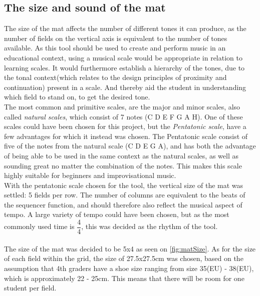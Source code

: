\subsection{The size and sound of the mat } \label{sizeSoundColorMat}
The size of the mat affects the number of different tones it can produce, as the number of fields on the vertical axis is equivalent to the number of tones available. As this tool should be used to create and perform music in an educational context, using a musical scale would be appropriate in relation to learning scales. It would furthermore establish a hierarchy of the tones, due to the tonal context(which relates to the design principles of proximity and continuation\cite{gestalt}) present in a scale\cite{cognitiveFoundationOfPitch}. And thereby aid the student in understanding which field to stand on, to get the desired tone. \\
The most common and primitive scales, are the major and minor scales, also called \textit{natural scales}, which consist of 7 notes (C D E F G A H)\cite{scales}. One of these scales could have been chosen for this project, but the \textit{Pentatonic scale}, have a few advantages for which it instead was chosen. The Pentatonic scale consist of five of the notes from the natural scale (C D E G A), and has both the advantage of being able to be used in the same context as the natural scales, as well as sounding great no matter the combination of the notes\cite{pentatonicScale}. This makes this scale highly suitable for beginners and improvisational music\cite{pentatonicScale}.\\ 

With the pentatonic scale chosen for the tool, the vertical size of the mat was settled: 5 fields per row. The number of columns are equivalent to the beats of the sequencer function, and should therefore also reflect the musical aspect of tempo. A large variety of tempo could have been chosen, but as the most commonly used time is $\dfrac{4}{4} $\cite{tempo}, this was decided as the rhythm of the tool.\\\\
The size of the mat was decided to be 5x4 as seen on \autoref{fig:matSize}. As for the size of each field within the grid, the size of 27.5x27.5cm was chosen, based on the assumption that 4th graders have a shoe size ranging from size 35(EU) - 38(EU), which is approximately 22 - 25cm. This means that there will be room for one student per field.

